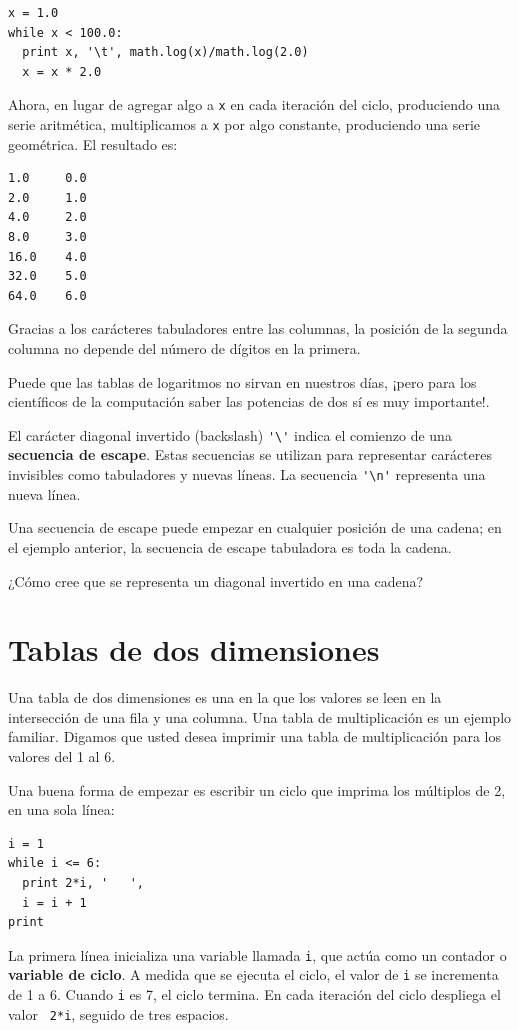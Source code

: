 \beforeverb
\begin{verbatim}
x = 1.0
while x < 100.0:
  print x, '\t', math.log(x)/math.log(2.0)
  x = x * 2.0
\end{verbatim}
\afterverb
%
Ahora, en lugar de agregar algo a  \texttt{x} en cada iteración del ciclo,
produciendo una serie aritmética, multiplicamos a  \texttt{x} por algo
constante, produciendo una serie geométrica.  El resultado es:


\beforeverb
\begin{verbatim}
1.0     0.0
2.0     1.0
4.0     2.0
8.0     3.0
16.0    4.0
32.0    5.0
64.0    6.0
\end{verbatim}
\afterverb
%
Gracias a los carácteres tabuladores entre las columnas, la posición
de la segunda columna no depende del número de dígitos en la
primera.

Puede que las tablas de logaritmos no sirvan en nuestros días, ¡pero
para los científicos de la computación saber las potencias de dos
sí es muy importante!.


El carácter diagonal invertido (backslash) \verb+'\'+ indica el 
comienzo de una {\bf secuencia de escape}.  Estas secuencias se
utilizan para representar carácteres invisibles como tabuladores
y nuevas líneas. La secuencia \verb+'\n'+ representa una nueva línea.

Una secuencia de escape puede empezar en cualquier posición de 
una cadena; en el ejemplo anterior, la secuencia de escape 
tabuladora es toda la cadena.

¿Cómo cree que se representa un diagonal invertido en una cadena?



\section{Tablas de dos dimensiones}

Una tabla de dos dimensiones es una en la que los
valores se leen en la intersección de una fila y una
columna. Una tabla de multiplicación es un ejemplo
familiar. Digamos que usted desea imprimir una tabla
de multiplicación para los valores del 1 al 6.

Una buena forma de empezar es escribir un ciclo que 
imprima los múltiplos de 2, en una sola línea:

\beforeverb
\begin{verbatim}
i = 1
while i <= 6:
  print 2*i, '   ',
  i = i + 1
print
\end{verbatim}
\afterverb
%
La primera línea inicializa una variable llamada \texttt{i}, que actúa como
un contador o  {\bf variable de ciclo}.  A medida que se ejecuta el ciclo,
el valor de \texttt{i} se incrementa de 1 a 6.  Cuando  \texttt{i} es 7, el 
ciclo termina. En cada iteración del ciclo despliega el valor {\tt
2*i}, seguido de tres espacios.

